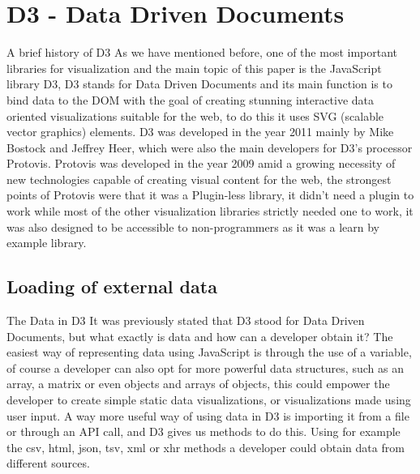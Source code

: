 \documentclass{bioinfo}
\begin{document}
\section{D3 - Data Driven Documents} \label{s:d3}
A brief history of D3
As we have mentioned before, one of the most important libraries for visualization and the main topic of this paper is the JavaScript library D3, D3 stands for Data Driven Documents and its main function is to bind data to the DOM with the goal of creating stunning interactive data oriented visualizations suitable for the web, to do this it uses SVG (scalable vector graphics) elements. D3 was developed in the year 2011 mainly by Mike Bostock and Jeffrey Heer, which were also the main developers for D3’s processor Protovis.
\newline
\hfill \break
Protovis was developed in the year 2009 amid a growing necessity of new technologies capable of creating visual content for the web, the strongest points of Protovis were that it was a Plugin-less library, it didn’t need a plugin to work while most of the other visualization libraries strictly needed one to work, it was also designed to be accessible to non-programmers as it was a learn by example library.

\subsection{Loading of external data}
The Data in D3
It was previously stated that D3 stood for Data Driven Documents, but what exactly is data and how can a developer obtain it? The easiest way of representing data using JavaScript is through the use of a variable, of course a developer can also opt for more powerful data structures, such as an array, a matrix or even objects and arrays of objects, this could empower the developer to create simple static data visualizations, or visualizations made using user input. A way more useful way of using data in D3 is importing it from a file or through an API call, and D3 gives us methods to do this. 
Using for example the csv, html, json, tsv, xml or xhr methods a developer could obtain data from different sources.
\end{document}
